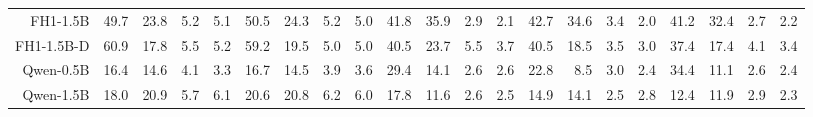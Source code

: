 \documentclass[letterpaper]{article}
\begin{document}
\begin{table}[t]
{\begin{tabular}{rrrrr|rrrr|rrrr|rrrr|rrrr}
FH1-1.5B & \cellcolor[HTML]{E0ECCC}49.7 & \cellcolor[HTML]{FDE7CC}23.8 & \cellcolor[HTML]{F9CFCC}5.2 & \cellcolor[HTML]{F9CFCC}5.1 & \cellcolor[HTML]{DCEBCC}50.5 & \cellcolor[HTML]{FDE9CC}24.3 & \cellcolor[HTML]{F9D0CC}5.2 & \cellcolor[HTML]{F9CFCC}5.0 & \cellcolor[HTML]{DDEBCC}41.8 & \cellcolor[HTML]{E9EECC}35.9 & \cellcolor[HTML]{F9D0CC}2.9 & \cellcolor[HTML]{F8CFCC}2.1 & \cellcolor[HTML]{DAEBCC}42.7 & \cellcolor[HTML]{EBEECC}34.6 & \cellcolor[HTML]{F9D0CC}3.4 & \cellcolor[HTML]{F8CECC}2.0 & \cellcolor[HTML]{DEECCC}41.2 & \cellcolor[HTML]{F0EFCC}32.4 & \cellcolor[HTML]{F9CFCC}2.7 & \cellcolor[HTML]{F8CFCC}2.2 \\
FH1-1.5B-D & \cellcolor[HTML]{CCE8CC}60.9 & \cellcolor[HTML]{FCE0CC}17.8 & \cellcolor[HTML]{F9CFCC}5.5 & \cellcolor[HTML]{F9CFCC}5.2 & \cellcolor[HTML]{CCE8CC}59.2 & \cellcolor[HTML]{FCE3CC}19.5 & \cellcolor[HTML]{F9CFCC}5.0 & \cellcolor[HTML]{F9CFCC}5.0 & \cellcolor[HTML]{E0ECCC}40.5 & \cellcolor[HTML]{FFF0CC}23.7 & \cellcolor[HTML]{F9D4CC}5.5 & \cellcolor[HTML]{F9D1CC}3.7 & \cellcolor[HTML]{DEECCC}40.5 & \cellcolor[HTML]{FDE8CC}18.5 & \cellcolor[HTML]{F9D0CC}3.5 & \cellcolor[HTML]{F9CFCC}3.0 & \cellcolor[HTML]{E6EDCC}37.4 & \cellcolor[HTML]{FDE6CC}17.4 & \cellcolor[HTML]{F9D2CC}4.1 & \cellcolor[HTML]{F9D0CC}3.4 \\
Qwen-0.5B & \cellcolor[HTML]{FBDECC}16.4 & \cellcolor[HTML]{FBDBCC}14.6 & \cellcolor[HTML]{F8CECC}4.1 & \cellcolor[HTML]{F8CCCC}3.3 & \cellcolor[HTML]{FCDFCC}16.7 & \cellcolor[HTML]{FBDCCC}14.5 & \cellcolor[HTML]{F8CECC}3.9 & \cellcolor[HTML]{F8CECC}3.6 & \cellcolor[HTML]{F7F0CC}29.4 & \cellcolor[HTML]{FCE1CC}14.1 & \cellcolor[HTML]{F9D0CC}2.6 & \cellcolor[HTML]{F9CFCC}2.6 & \cellcolor[HTML]{FEEECC}22.8 & \cellcolor[HTML]{FAD8CC}8.5 & \cellcolor[HTML]{F9CFCC}3.0 & \cellcolor[HTML]{F8CECC}2.4 & \cellcolor[HTML]{ECEECC}34.4 & \cellcolor[HTML]{FBDCCC}11.1 & \cellcolor[HTML]{F9CFCC}2.6 & \cellcolor[HTML]{F9CFCC}2.4 \\
Qwen-1.5B & \cellcolor[HTML]{FCE0CC}18.0 & \cellcolor[HTML]{FCE4CC}20.9 & \cellcolor[HTML]{F9D0CC}5.7 & \cellcolor[HTML]{F9D0CC}6.1 & \cellcolor[HTML]{FCE4CC}20.6 & \cellcolor[HTML]{FDE5CC}20.8 & \cellcolor[HTML]{F9D1CC}6.2 & \cellcolor[HTML]{F9D1CC}6.0 & \cellcolor[HTML]{FDE7CC}17.8 & \cellcolor[HTML]{FBDDCC}11.6 & \cellcolor[HTML]{F9CFCC}2.6 & \cellcolor[HTML]{F9CFCC}2.5 & \cellcolor[HTML]{FCE2CC}14.9 & \cellcolor[HTML]{FCE1CC}14.1 & \cellcolor[HTML]{F8CECC}2.5 & \cellcolor[HTML]{F9CFCC}2.8 & \cellcolor[HTML]{FBDECC}12.4 & \cellcolor[HTML]{FBDECC}11.9 & \cellcolor[HTML]{F9D0CC}2.9 & \cellcolor[HTML]{F8CFCC}2.3 \\

\end{tabular}}
\end{table}
\end{document}
